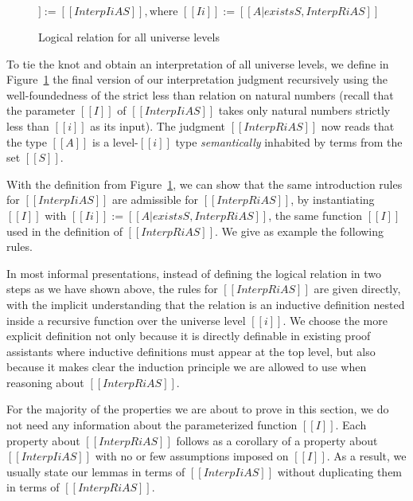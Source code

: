 \documentclass[acmsmall]{acmart}
\begin{document}
\begin{figure}[h]
\begin{equation*}
    [[InterpR i A S]] := [[ Interp I i A S  ]], \text{where } [[I i]] := [[{A | exists S , InterpR i A S}]]
\end{equation*}
\caption{Logical relation for all universe levels}
\label{fig:logrelrec}
\end{figure}
To tie the knot and obtain an interpretation of all universe levels,
we define in Figure~\ref{fig:logrelrec} the final version of our interpretation judgment recursively
using the well-foundedness of the strict less than relation on natural
numbers (recall that
the parameter $[[I]]$ of $[[Interp I i A S]]$ takes only natural
numbers strictly less than $[[i]]$ as its input).
The judgment $[[InterpR i A S]]$ now reads that the type $[[A]]$ is a
level-$[[i]]$ type \emph{semantically} inhabited by terms from the set
$[[S]]$.

With the definition from Figure~\ref{fig:logrelrec}, we can
show that the same introduction rules for $[[Interp I i A S]]$ are
admissible for $[[InterpR i A S]]$, by
instantiating $[[I]]$ with $[[I i]] := [[{A | exists S , InterpR i A
  S}]]$, the same function $[[I]]$ used in the definition of $[[InterpR i A
S]]$. We give as example the following rules.
\begin{center}
 \qquad {}
\end{center}

In most informal presentations, instead of defining the logical
relation in two steps as we have shown above, the rules for $[[InterpR
i A S]]$ are given directly, with the implicit understanding that the
relation is an inductive definition nested inside a recursive
function over the universe level $[[i]]$. We choose
the more explicit definition not only because it is directly definable
in existing proof assistants where inductive definitions must appear
at the top level, but also because it makes clear the induction
principle we are allowed to use when reasoning about $[[InterpR i A
S]]$.



For the majority of the properties we are about to prove in this section, we
do not need any information about the parameterized function $[[I]]$.
Each property about $[[InterpR i A S]]$ follows as a corollary of
a property about $[[Interp I i A S]]$ with no or few assumptions imposed on
$[[I]]$. As a result, we usually state our lemmas in terms of
$[[Interp I i A S]]$ without duplicating them in terms of $[[InterpR i
A S]]$.
\end{document}
